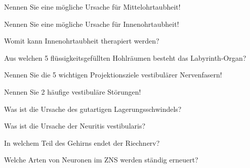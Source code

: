 \documentclass[10pt, a4paper]{exam}
\begin{document}
\begin{questions}
  \question Nennen Sie eine mögliche Ursache für Mittelohrtaubheit!
  \begin{solution}

  \end{solution}

  \question Nennen Sie eine mögliche Ursache für Innenohrtaubheit!
  \begin{solution}

  \end{solution}

  \question Womit kann Innenohrtaubheit therapiert werden?
  \begin{solution}

  \end{solution}

  \question Aus welchen 5 flüssigkeitsgefüllten Hohlräumen besteht das Labyrinth-Organ?
  \begin{solution}

  \end{solution}

  \question Nennen Sie die 5 wichtigen Projektionsziele vestibulärer Nervenfasern!
  \begin{solution}

  \end{solution}

  \question Nennen Sie 2 häufige vestibuläre Störungen!
  \begin{solution}

  \end{solution}

  \question Was ist die Ursache des gutartigen Lagerungsschwindels?
  \begin{solution}

  \end{solution}

  \question Was ist die Ursache der Neuritis vestibularis?
  \begin{solution}

  \end{solution}

  \question In welchem Teil des Gehirns endet der Riechnerv?
  \begin{solution}

  \end{solution}

  \question Welche Arten von Neuronen im ZNS werden ständig erneuert?
  \begin{solution}

  \end{solution}


\end{questions}
\end{document}
